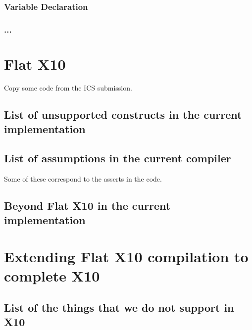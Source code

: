 \documentclass{article}
\begin{document}
\subsubsection{Variable Declaration}
\subsubsection{...}


\section {Flat X10}
Copy some code from the ICS submission.
\subsection{List of unsupported constructs in the current implementation}
\subsection{ List of assumptions in the current compiler }
Some of these correspond to the asserts in the code.

\subsection{Beyond Flat X10 in the current implementation}

\section{Extending Flat X10 compilation to complete X10}
\subsection{List of the things that we do not support in X10}
\end{document}
